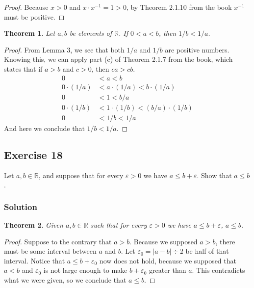 \documentclass[12pt]{article}
\newtheorem*{thm}{Theorem}
\begin{document}
\begin{proof}
Because $x > 0$ and $x \cdot x^{-1} = 1 > 0$, by Theorem 2.1.10 from the book $x^{-1}$ must be positive.
\end{proof}

\begin{thm}
Let $a, b$ be elements of $\mathbb{R}$. If $0 < a < b$, then $1/b < 1/a$.
\end{thm}

\begin{proof}
From Lemma 3, we see that both $1/a$ and $1/b$ are positive numbers. Knowing this, we can apply part (c) of Theorem 2.1.7 from the book, which states that if $a > b$ and $c > 0$, then $ca > cb$.
\begin{align*}
0 &< a < b \\
0\cdot\left(1/a\right) &< a\cdot\left(1/a\right) < b\cdot\left(1/a\right) \\
0 &< 1 < b / a \\
0\cdot\left(1/b\right) &< 1\cdot\left(1/b\right) < \left(b / a\right)\cdot\left(1 / b\right)\\
0 &< 1/b < 1/a
\end{align*}
And here we conclude that $1 / b < 1 / a$.
\end{proof}

\subsection*{Exercise 18}
Let $a, b \in \mathbb{R}$, and suppose that for every $\varepsilon > 0$ we have $a \leq b + \varepsilon$. Show that $a \leq b$.

\subsubsection*{Solution}
\begin{thm}
Given $a, b \in \mathbb{R}$ such that for every $\varepsilon > 0$ we have $a \leq b + \varepsilon$, $a \leq b$.
\end{thm}

\begin{proof}
Suppose to the contrary that $a > b$. Because we supposed $a > b$, there must be some interval between $a$ and $b$. Let $\varepsilon_0 = \left|a - b\right| \div 2$ be half of that interval. Notice that $a \leq b + \varepsilon_0$ now does not hold, because we supposed that $a < b$ and $\varepsilon_0$ is not large enough to make $b + \varepsilon_0$ greater than $a$. This contradicts what we were given, so we conclude that $a \leq b$.
\end{proof}
\end{document}
